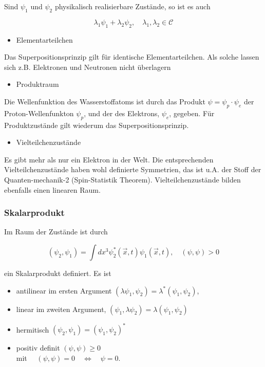 \documentclass[10pt, letterpaper]{article}
\begin{document}
Sind $\psi_{1}$ und $\psi_{2}$ physikalisch realisierbare Zustände, so ist es auch

$$
\lambda_{1} \psi_{1}+\lambda_{2} \psi_{2}, \quad \lambda_{1}, \lambda_{2} \in \mathcal{C}
$$

\begin{itemize}
  \item Elementarteilchen
\end{itemize}

Das Superpositionsprinzip gilt für identische Elementarteilchen. Als solche lassen sich z.B. Elektronen und Neutronen nicht überlagern

\begin{itemize}
  \item Produktraum
\end{itemize}

Die Wellenfunktion des Wasserstoffatoms ist durch das Produkt $\psi=\psi_{p} \cdot \psi_{e}$ der Proton-Wellenfunkton $\psi_{p}$, und der des Elektrons, $\psi_{e}$, gegeben. Für Produktzustände gilt wiederum das Superpositionsprinzip.

\begin{itemize}
  \item Vielteilchenzustände
\end{itemize}

Es gibt mehr als nur ein Elektron in der Welt. Die entsprechenden Vielteilchenzustände haben wohl definierte Symmetrien, das ist u.A. der Stoff der Quanten-mechanik-2 (Spin-Statistik Theorem). Vielteilchenzustände bilden ebenfalls einen linearen Raum.

\subsubsection*{Skalarprodukt}
Im Raum der Zustände ist durch

$$
\left(\psi_{2}, \psi_{1}\right)=\int d x^{3} \psi_{2}^{*}(\vec{x}, t) \psi_{1}(\vec{x}, t), \quad(\psi, \psi)>0
$$

ein Skalarprodukt definiert. Es ist

\begin{itemize}
  \item antilinear im ersten Argument $\left(\lambda \psi_{1}, \psi_{2}\right)=\lambda^{*}\left(\psi_{1}, \psi_{2}\right)$,
  \item linear im zweiten Argument, $\left(\psi_{1}, \lambda \psi_{2}\right)=\lambda\left(\psi_{1}, \psi_{2}\right)$
  \item hermitisch $\left(\psi_{2}, \psi_{1}\right)=\left(\psi_{1}, \psi_{2}\right)^{*}$
  \item positiv definit $(\psi, \psi) \geq 0$\\
mit $\quad(\psi, \psi)=0 \quad \Leftrightarrow \quad \psi=0$.
\end{itemize}
\end{document}

